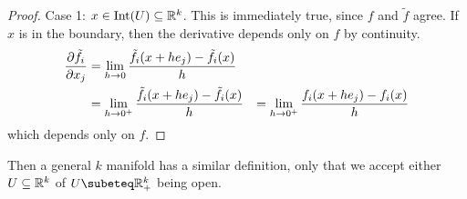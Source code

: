 \documentclass[12pt]{article}
\begin{document}
\begin{proof}
    Case 1: $x \in \text{Int}(U) \subseteq \mathbb{R}^k$. This is immediately true, since $f$ and $\tilde f$ agree. If $x$ is in the boundary, then the derivative depends only on $f$ by continuity.
    \begin{align*}
        \frac{\partial \tilde f_i}{\partial x_j} &= \lim_{h\rightarrow0} \frac{\tilde f_i(x + he_j) - \tilde f_i(x)}{h} \\
                              &= \lim_{h\rightarrow0^+} \frac{\tilde f_i(x + he_j) - \tilde f_i(x)}{h}
                              &= \lim_{h\rightarrow0^+} \frac{f_i(x + he_j) - f_i(x)}{h}
    \end{align*}
    which depends only on $f$.
\end{proof}

Then a general $k$ manifold has a similar definition, only that we accept either $U \subseteq \mathbb{R}^k$ of $U \subeteq \R^k_+$ being open.
\end{document}
